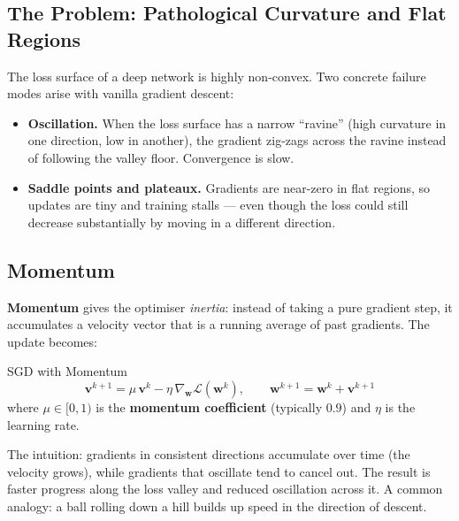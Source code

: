 \documentclass[11pt,a4paper]{article}
\newcommand{\term}[1]{\textcolor{DefGreen}{\textbf{#1}}}
\begin{document}
\subsection{The Problem: Pathological Curvature and Flat Regions}

The loss surface of a deep network is highly non-convex. Two concrete failure modes arise with vanilla gradient descent:

\begin{itemize}
  \item \textbf{Oscillation.} When the loss surface has a narrow ``ravine'' (high curvature in one direction, low in another), the gradient zig-zags across the ravine instead of following the valley floor. Convergence is slow.
  \item \textbf{Saddle points and plateaux.} Gradients are near-zero in flat regions, so updates are tiny and training stalls — even though the loss could still decrease substantially by moving in a different direction.
\end{itemize}

\subsection{Momentum}

\term{Momentum} gives the optimiser \emph{inertia}: instead of taking a pure gradient step, it accumulates a velocity vector that is a running average of past gradients. The update becomes:

\begin{defbox}{SGD with Momentum}
\[
\mathbf{v}^{k+1} = \mu\,\mathbf{v}^k - \eta\,\nabla_{\mathbf{w}} \mathcal{L}(\mathbf{w}^k), \qquad
\mathbf{w}^{k+1} = \mathbf{w}^k + \mathbf{v}^{k+1}
\]
where $\mu \in [0,1)$ is the \term{momentum coefficient} (typically $0.9$) and $\eta$ is the learning rate.
\end{defbox}

The intuition: gradients in consistent directions accumulate over time (the velocity grows), while gradients that oscillate tend to cancel out. The result is faster progress along the loss valley and reduced oscillation across it. A common analogy: a ball rolling down a hill builds up speed in the direction of descent.
\end{document}
